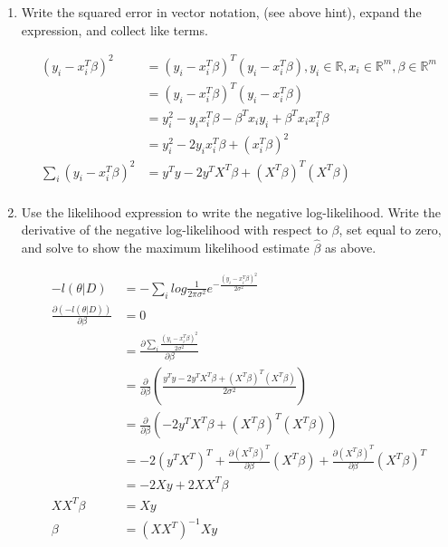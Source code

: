 \documentclass[12pt,letter]{article}
\newcommand{\R}{\mathbb{R}}
\begin{document}
\begin{enumerate}
  \pagebreak
  
  \item Write the squared error in vector notation, (see above hint), expand the expression, and collect like terms.
    
\begin{align*}
  (y_i-x_i^T \beta)^2 &= (y_i-x_i^T \beta)^T(y_i-x_i^T \beta), y_i \in \R, x_i \in \R^m, \beta \in \R^m\\
                      &= (y_i-x_i^T \beta)^T(y_i-x_i^T \beta)\\
                      &= y_i^2 - y_i x_i^T \beta - \beta^T x_i y_i + \beta^T x_i  x_i^T \beta\\
                      &= y_i^2 - 2 y_i x_i^T \beta + (x_i^T \beta)^2\\
  \sum_i (y_i-x_i^T \beta)^2 &= y^T y - 2 y^T X^T \beta + (X^T \beta)^T (X^T \beta)\\
\end{align*}

  \item Use the likelihood expression to write the negative log-likelihood. Write the
derivative of the negative log-likelihood with respect to $\beta$, set equal to zero, and solve
to show the maximum likelihood estimate $\hat{\beta}$ as above.

\begin{align*}
  -l(\theta|D) &= -\sum_i log \frac{1}{2 \pi \sigma^2} e^{-\frac{(y_i-x_i^T \beta)^2}{2\sigma^2}}\\
  \frac{\partial (-l(\theta|D))}{\partial \beta} &= 0\\
               &= \frac{\partial \sum_i \frac{(y_i-x_i^T \beta)^2}{2\sigma^2}}{\partial \beta}\\
               &= \frac{\partial}{\partial \beta}(\frac{y^T y - 2 y^T X^T \beta + (X^T \beta)^T (X^T \beta)}{2\sigma^2})\\
               &= \frac{\partial}{\partial \beta}( - 2 y^T X^T \beta + (X^T \beta)^T (X^T \beta))\\
               &= - 2 (y^T X^T)^T + \frac{\partial (X^T\beta)^T}{\partial \beta}(X^T \beta) +  \frac{\partial (X^T \beta)^T }{\partial \beta} (X^T \beta)^T\\
               &= -2 X y + 2 X X^T \beta\\
  X X^T \beta &= Xy \\
  \beta &= (X X^T)^{-1} X y \\
\end{align*}

\end{enumerate}
\end{document}

